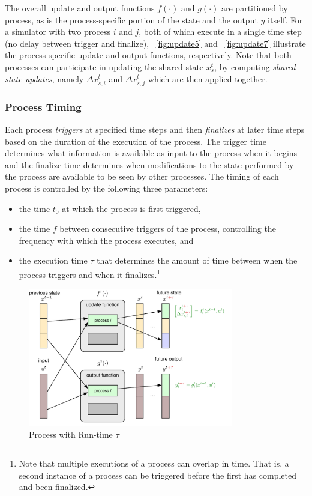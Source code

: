 \documentclass[12pt]{article}
\numberwithin{equation}{section}
\numberwithin{table}{section}
\numberwithin{figure}{section}
\begin{document}
The overall update and output functions $f(\cdot)$ and $g(\cdot)$ are partitioned by process, as is the process-specific portion of the state and the output $y$ itself. For a simulator with two process $i$ and $j$, both of which execute in a single time step (no delay between trigger and finalize), \figurename~\ref{fig:update5} and \figurename~\ref{fig:update7} illustrate the process-specific update and output functions, respectively. Note that both processes can participate in updating the shared state $x_s^t$, by computing \emph{shared state updates}, namely $\Delta x_{s,i}^t$ and $\Delta x_{s,j}^t$ which are then applied together.

\subsubsection{Process Timing}
\label{sec:timing}

Each process \emph{triggers} at specified time steps and then \emph{finalizes} at later time steps based on the duration of the execution of the process. The trigger time determines what information is available as input to the process when it begins and the finalize time determines when modifications to the state performed by the process are available to be seen by other processes.
The timing of each process is controlled by the following three parameters:
\begin{itemize}
\item the time $t_0$ at which the process is first triggered,
\item the time $f$ between consecutive triggers of the process, controlling the frequency with which the process executes, and
\item the execution time $\tau$ that determines the amount of time between when the process triggers and when it finalizes.\footnote{Note that multiple executions of a process can overlap in time. That is, a second instance of a process can be triggered before the first has completed and been finalized.}
\end{itemize}


\begin{figure}[hbtp]
  \centering
  \includegraphics[width=0.8\textwidth]{figures/simulator-update-diagram-delay}
  \caption{Process with Run-time $\tau$}
  \label{fig:updatetau}
\end{figure}
\end{document}
